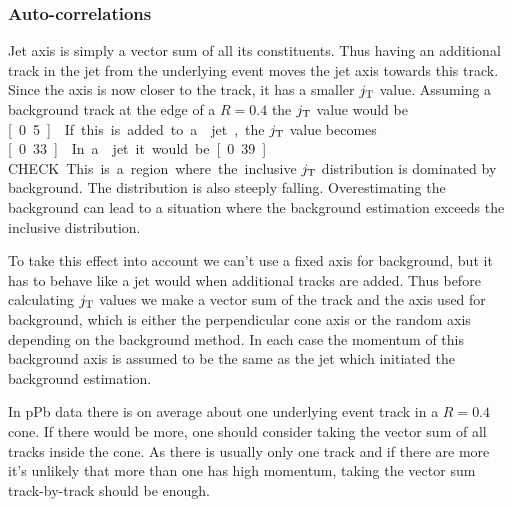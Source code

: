 \subsubsection{Auto-correlations}
\label{sec:autoC}
Jet axis is simply a vector sum of all its constituents. Thus having an additional track in the jet from the underlying event moves the jet axis towards this track. Since the axis is now closer to the track, it has a smaller $j_{\rm T}$ value. Assuming a \unit[1]{\gev} background track  at the edge of a $R = 0.4$ the $j_{\rm T}$ value would be \unit[0.5]{\gev}. If this is added to a  \unit[5]{\gev} jet, the $j_{\rm T}$ value becomes \unit[0.33]{\gev}. In a \unit[50]{\gev} jet it would be \unit[0.39]{\gev}.{\color{red} CHECK} This is a region where the inclusive $j_{\rm T}$ distribution is dominated by background. The distribution is also steeply falling. Overestimating the background can lead to a situation where the background estimation exceeds the inclusive distribution.


To take this effect into account we can't use a fixed axis for background, but it has to behave like a jet would when additional tracks are added. Thus before calculating $j_{\rm T}$ values we make a vector sum of the track and the axis used for background, which is either the perpendicular cone axis or the random axis depending on the background method. In each case the momentum of this background axis is assumed to be the same as the jet which initiated the background estimation.

In pPb data there is on average about one underlying event track in a $R = 0.4$ cone. If there would be more, one should consider taking the vector sum of all tracks inside the cone. As there is usually only one track and if there are more it's unlikely that more than one has high momentum, taking the vector sum track-by-track should be enough.






